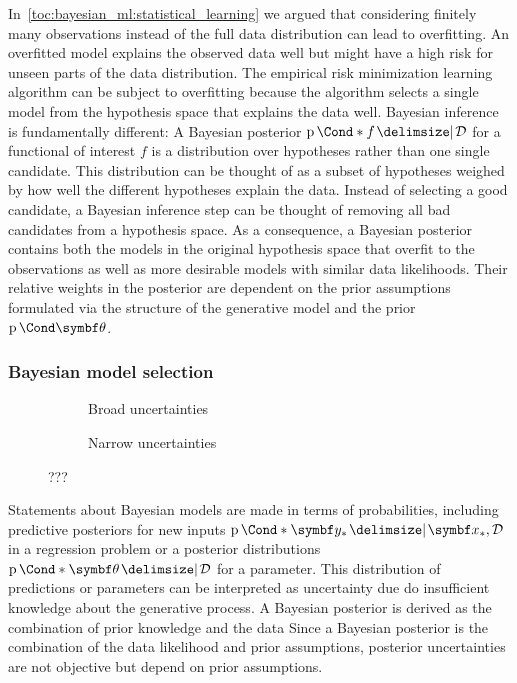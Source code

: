 In~\cref{toc:bayesian_ml:statistical_learning} we argued that considering finitely many observations instead of the full data distribution can lead to overfitting.
An overfitted model explains the observed data well but might have a high risk for unseen parts of the data distribution.
The empirical risk minimization learning algorithm can be subject to overfitting because the algorithm selects a single model from the hypothesis space that explains the data well.
Bayesian inference is fundamentally different:
A Bayesian posterior $\Prob*{f \given \Dc}$ for a functional of interest $f$ is a distribution over hypotheses rather than one single candidate.
This distribution can be thought of as a subset of hypotheses weighed by how well the different hypotheses explain the data.
Instead of selecting a good candidate, a Bayesian inference step can be thought of removing all bad candidates from a hypothesis space.
As a consequence, a Bayesian posterior contains both the models in the original hypothesis space that overfit to the observations as well as more desirable models with similar data likelihoods.
Their relative weights in the posterior are dependent on the prior assumptions formulated via the structure of the generative model and the prior $\Prob{\mat{\theta}}$.


\subsubsection{Bayesian model selection}
\begin{figure}[t]
    \begin{subfigure}[b]{\halffigurewidth}
        \centering
        \caption{
            Broad uncertainties
            \label{fig:bayesian_ml:polynomials:bayes_broad}
        }
    \end{subfigure}
    \hfill
    \begin{subfigure}[b]{\halffigurewidth}
        \centering
        \caption{
            Narrow uncertainties
            \label{fig:bayesian_ml:polynomials:bayes_narrow}
        }
    \end{subfigure}
    \caption[ML Interpolation]{
        ???
        \label{fig:bayesian_ml:polynomials:bayes}
    }
\end{figure}
Statements about Bayesian models are made in terms of probabilities, including predictive posteriors for new inputs $\Prob*{\mat{y}_\ast \given \mat{x}_\ast, \Dc}$ in a regression problem or a posterior distributions $\Prob*{\mat{\theta} \given \Dc}$ for a parameter.
This distribution of predictions or parameters can be interpreted as uncertainty due do insufficient knowledge about the generative process.
A Bayesian posterior is derived as the combination of prior knowledge and the data
Since a Bayesian posterior is the combination of the data likelihood and prior assumptions, posterior uncertainties are not objective but depend on prior assumptions.

